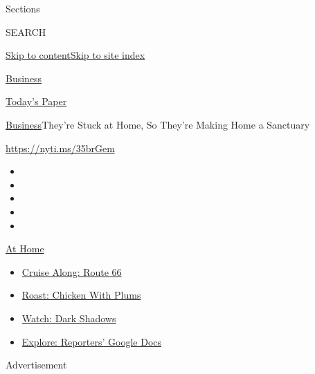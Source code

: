 Sections

SEARCH

\protect\hyperlink{site-content}{Skip to
content}\protect\hyperlink{site-index}{Skip to site index}

\href{https://www.nytimes3xbfgragh.onion/section/business}{Business}

\href{https://myaccount.nytimes3xbfgragh.onion/auth/login?response_type=cookie\&client_id=vi}{}

\href{https://www.nytimes3xbfgragh.onion/section/todayspaper}{Today's
Paper}

\href{/section/business}{Business}\textbar{}They're Stuck at Home, So
They're Making Home a Sanctuary

\url{https://nyti.ms/35brGem}

\begin{itemize}
\item
\item
\item
\item
\item
\end{itemize}

\href{https://www.nytimes3xbfgragh.onion/spotlight/at-home?action=click\&pgtype=Article\&state=default\&region=TOP_BANNER\&context=at_home_menu}{At
Home}

\begin{itemize}
\tightlist
\item
  \href{https://www.nytimes3xbfgragh.onion/2020/09/07/travel/route-66.html?action=click\&pgtype=Article\&state=default\&region=TOP_BANNER\&context=at_home_menu}{Cruise
  Along: Route 66}
\item
  \href{https://www.nytimes3xbfgragh.onion/2020/09/04/dining/sheet-pan-chicken.html?action=click\&pgtype=Article\&state=default\&region=TOP_BANNER\&context=at_home_menu}{Roast:
  Chicken With Plums}
\item
  \href{https://www.nytimes3xbfgragh.onion/2020/09/04/arts/television/dark-shadows-stream.html?action=click\&pgtype=Article\&state=default\&region=TOP_BANNER\&context=at_home_menu}{Watch:
  Dark Shadows}
\item
  \href{https://www.nytimes3xbfgragh.onion/interactive/2020/at-home/even-more-reporters-editors-diaries-lists-recommendations.html?action=click\&pgtype=Article\&state=default\&region=TOP_BANNER\&context=at_home_menu}{Explore:
  Reporters' Google Docs}
\end{itemize}

Advertisement

